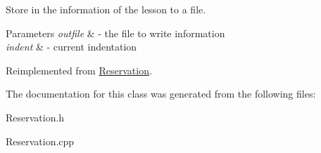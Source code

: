 Store in the information of the lesson to a file. 


\begin{DoxyParams}{Parameters}
{\em outfile} & -\/ the file to write information \\
\hline
{\em indent} & -\/ current indentation \\
\hline
\end{DoxyParams}


Reimplemented from \mbox{\hyperlink{class_reservation_a8ec83fe2eb15294c3a51a9998ed17df7}{Reservation}}.



The documentation for this class was generated from the following files\+:\begin{DoxyCompactItemize}
\item 
Reservation.\+h\item 
Reservation.\+cpp\end{DoxyCompactItemize}
